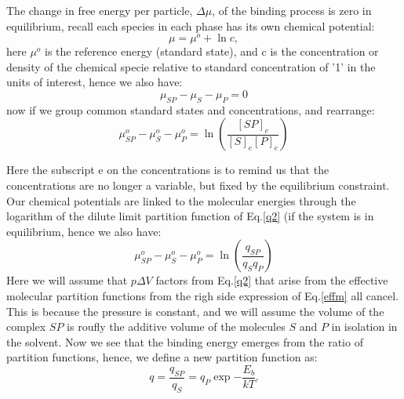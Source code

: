 The change in free energy per particle, $\Delta \mu$, of the binding process is zero in equilibrium, recall each species in each phase has its own chemical potential:
\begin{equation}\label{chemc}
 \mu = \mu^o + \ln{c},
 \end{equation}
  here $\mu^o$ is the reference energy (standard state), and c is the concentration or density of the chemical specie relative to standard concentration of '1' in the units of interest, hence we also have:
\begin{equation}
 \mu_{SP} - \mu_S - \mu_P   = 0
\end{equation}
now if we group common standard states and concentrations, and rearrange:
\begin{equation}\label{}
  \mu_{SP}^o - \mu_S^o - \mu_P^o = \ln( \frac{ [SP]_e }{[S]_e [P]_e} )
\end{equation}


Here the subscript e on the concentrations is to remind us that the concentrations are no longer a variable, but fixed by the equilibrium constraint.  Our chemical potentials are linked to the molecular energies through the logarithm of the dilute limit partition function of Eq.\ref{q2} (if the system is in equilibrium, hence we also have:
\begin{equation}\label{effm}
  \mu_{SP}^o - \mu_S^o - \mu_P^o = \ln( \frac{ q_{SP} } { q_S q_P })
\end{equation}
Here we will assume that $p\Delta V$ factors from Eq.\ref{q2} that arise from the effective molecular partition functions from the righ side expression of Eq.\ref{effm} all cancel.  This is because the pressure is constant, and we will assume the volume of the complex $SP$ is roufly the additive volume of the molecules $S$ and $P$ in isolation in the solvent.  Now we see that the binding energy emerges from the ratio of partition functions, hence, we define a new partition function as:
\begin{equation}\label{}
  q = \frac{ q_{SP} } { q_S } = q_{P} \exp{-\frac{E_b}{kT} }.
\end{equation}

